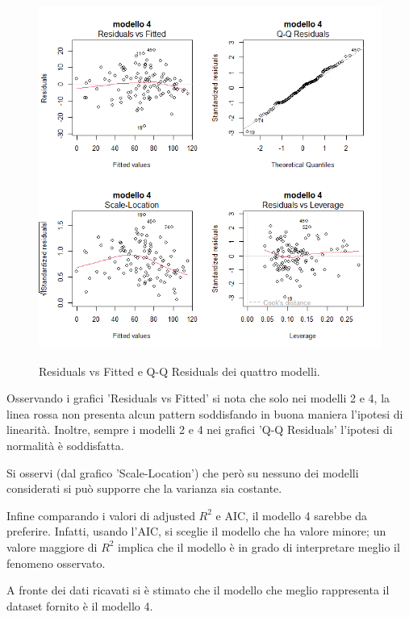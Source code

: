 \begin{figure}[H]
	\centering
	\includegraphics[width=0.95\linewidth]{../graphs/diagnostica/diagnostica_stepwise_iterations}
	\label{fig:diagnosticaridotto}
	\caption{Residuals vs Fitted e Q-Q Residuals dei quattro modelli.}
\end{figure}
Osservando i grafici 'Residuals vs Fitted' si nota che solo nei modelli 2 e 4, la linea rossa non presenta alcun pattern soddisfando in buona maniera l'ipotesi di linearità. Inoltre, sempre i modelli 2 e 4 nei grafici 'Q-Q Residuals' l'ipotesi di normalità è soddisfatta. 

Si osservi (dal grafico 'Scale-Location') che però su nessuno dei modelli considerati si può supporre che la varianza sia costante.

Infine comparando i valori di adjusted $R^2$ e AIC, il modello 4 sarebbe da preferire. Infatti, usando l'AIC, si sceglie il modello che ha valore minore; un valore maggiore di $R^2$ implica che il modello è in grado di interpretare meglio il fenomeno osservato.

A fronte dei dati ricavati si è stimato che il modello che meglio rappresenta il dataset fornito è il modello 4.


